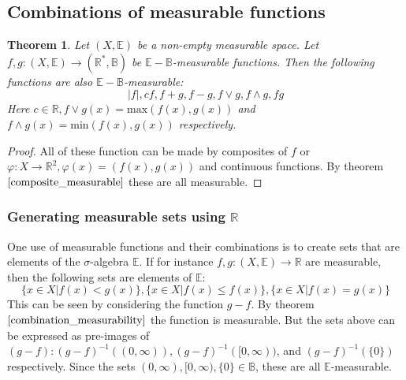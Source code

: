 \documentclass[12pt, a4paper]{article}
\newtheorem{theorem}{Theorem}[section]
\numberwithin{equation}{section}
\begin{document}
\subsection{Combinations of measurable functions}
\begin{theorem}
\label{combination_measurability}
Let $(X,\mathbb{E})$ be a non-empty measurable space. Let $f, g: (X,\mathbb{E})\rightarrow(\mathbb{R}^*,\mathbb{B})$ be $\mathbb{E}-\mathbb{B}$-measurable functions. Then the following functions are also $\mathbb{E}-\mathbb{B}$-measurable:
\begin{equation}
|f|, cf, f+g, f-g, f\vee g, f\wedge g, fg 
\end{equation}
Here $c\in\mathbb{R}, f\vee g(x)=\textrm{max}(f(x),g(x))$ and $f\wedge g(x)=\textrm{min}(f(x),g(x))$ respectively.
\end{theorem}
\begin{proof}
All of these function can be made by composites of $f$ or $\varphi: X\rightarrow\mathbb{R}^2, \varphi(x)=(f(x), g(x))$ and continuous functions. By theorem $\ref{composite_measurable}$ these are all measurable.
\end{proof}

\subsubsection{Generating measurable sets using $\mathbb{R}$}

One use of measurable functions and their combinations is to create sets that are elements of the $\sigma$-algebra $\mathbb{E}$. If for instance $f, g: (X,\mathbb{E})\rightarrow\mathbb{R}$ are measurable, then the following sets are elements of $\mathbb{E}$:
\begin{equation}
\{x\in X|f(x)<g(x)\}, \{x\in X|f(x)\le f(x)\}, \{x\in X|f(x)=g(x)\}
\end{equation}
This can be seen by considering the function $g-f$. By theorem $\ref{combination_measurability}$ the function is measurable. But the sets above can be expressed as pre-images of $(g-f): (g-f)^{-1}((0,\infty)), (g-f)^{-1}([0,\infty))$, and $(g-f)^{-1}(\{0\})$ respectively. Since the sets $(0,\infty), [0,\infty),\{0\}\in\mathbb{B}$, these are all $\mathbb{E}$-measurable.
\end{document}
